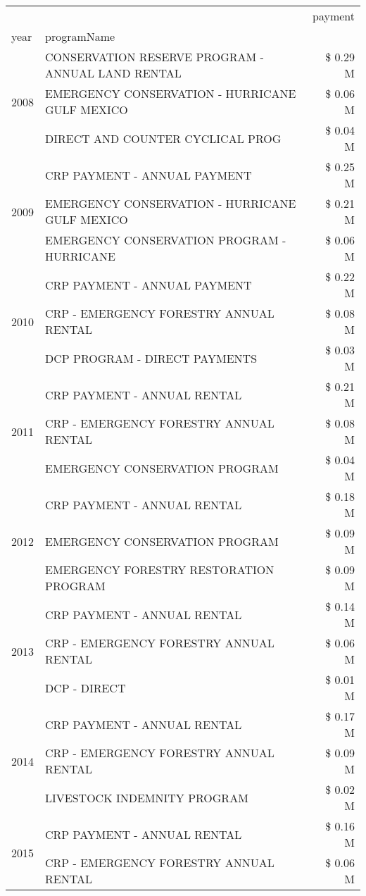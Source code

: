 \begin{tabular}{llr}
\toprule
 &  & payment \\
year & programName &  \\
\midrule
\multirow[t]{3}{*}{2008} & CONSERVATION RESERVE PROGRAM - ANNUAL LAND RENTAL & \$ 0.29 M \\
 & EMERGENCY CONSERVATION - HURRICANE GULF MEXICO & \$ 0.06 M \\
 & DIRECT AND COUNTER CYCLICAL PROG & \$ 0.04 M \\
\cline{1-3}
\multirow[t]{3}{*}{2009} & CRP PAYMENT - ANNUAL PAYMENT & \$ 0.25 M \\
 & EMERGENCY CONSERVATION - HURRICANE GULF MEXICO & \$ 0.21 M \\
 & EMERGENCY CONSERVATION PROGRAM - HURRICANE & \$ 0.06 M \\
\cline{1-3}
\multirow[t]{3}{*}{2010} & CRP PAYMENT - ANNUAL PAYMENT & \$ 0.22 M \\
 & CRP - EMERGENCY FORESTRY ANNUAL RENTAL & \$ 0.08 M \\
 & DCP PROGRAM - DIRECT PAYMENTS & \$ 0.03 M \\
\cline{1-3}
\multirow[t]{3}{*}{2011} & CRP PAYMENT - ANNUAL RENTAL & \$ 0.21 M \\
 & CRP - EMERGENCY FORESTRY ANNUAL RENTAL & \$ 0.08 M \\
 & EMERGENCY CONSERVATION PROGRAM & \$ 0.04 M \\
\cline{1-3}
\multirow[t]{3}{*}{2012} & CRP PAYMENT - ANNUAL RENTAL & \$ 0.18 M \\
 & EMERGENCY CONSERVATION PROGRAM & \$ 0.09 M \\
 & EMERGENCY FORESTRY RESTORATION PROGRAM & \$ 0.09 M \\
\cline{1-3}
\multirow[t]{3}{*}{2013} & CRP PAYMENT - ANNUAL RENTAL & \$ 0.14 M \\
 & CRP - EMERGENCY FORESTRY ANNUAL RENTAL & \$ 0.06 M \\
 & DCP - DIRECT & \$ 0.01 M \\
\cline{1-3}
\multirow[t]{3}{*}{2014} & CRP PAYMENT - ANNUAL RENTAL & \$ 0.17 M \\
 & CRP - EMERGENCY FORESTRY ANNUAL RENTAL & \$ 0.09 M \\
 & LIVESTOCK INDEMNITY PROGRAM & \$ 0.02 M \\
\cline{1-3}
\multirow[t]{2}{*}{2015} & CRP PAYMENT - ANNUAL RENTAL & \$ 0.16 M \\
 & CRP - EMERGENCY FORESTRY ANNUAL RENTAL & \$ 0.06 M \\
\cline{1-3}

\end{tabular}
